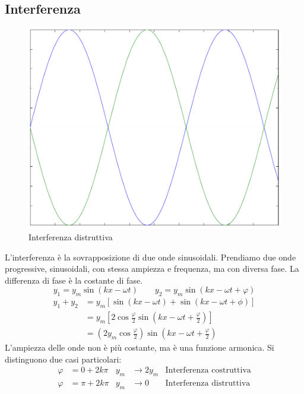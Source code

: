 \subsection{Interferenza}
\begin{figure}[htbp]
   \centering
   \includegraphics[scale=0.5]{immagini/fisica1/interferenza_distruttiva}
   \caption{Interferenza distruttiva}
\end{figure}
L'interferenza è la sovrapposizione di due onde sinusoidali. Prendiamo due onde progressive, sinusoidali, con stessa ampiezza e frequenza, ma con diversa fase. La differenza di fase è la costante di fase.
\begin{equation*}y_1=y_m\sin(kx-\omega t)\qquad y_2=y_m\sin(kx-\omega t+\varphi)\end{equation*}
\begin{align*}
y_1+y_2&=y_m\left[\sin\left(kx-\omega t\right)+\sin\left(kx-\omega t+\phi\right)\right]\\
&=y_m\left[2\cos\frac{\varphi}{2}\sin\left(kx-\omega t+\frac{\varphi}{2}\right)\right]\\
&=\left(2y_m\cos\frac{\varphi}{2}\right)\sin\left(kx-\omega t+\frac{\varphi}{2}\right)
\end{align*}
L'ampiezza delle onde non è più costante, ma è una funzione armonica. Si distinguono due casi particolari:
\begin{align*}
\varphi&=0+2k\pi&y_m&\rightarrow 2y_m&\text{Interferenza costruttiva}\\
\varphi&=\pi+2k\pi&y_m&\rightarrow 0&\text{Interferenza distruttiva}
\end{align*}
